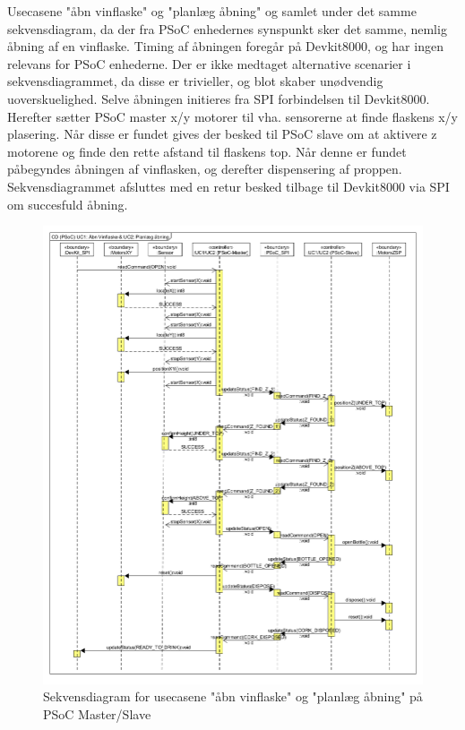 Usecasene "åbn vinflaske" og "planlæg åbning" og samlet under det samme sekvensdiagram, da der fra PSoC enhedernes synspunkt sker det samme, nemlig 
åbning af en vinflaske. Timing af åbningen foregår på Devkit8000, og har ingen relevans for PSoC enhederne. Der er ikke medtaget alternative scenarier i 
sekvensdiagrammet, da disse er trivieller, og blot skaber unødvendig uoverskuelighed. Selve åbningen initieres fra SPI forbindelsen til Devkit8000. Herefter
sætter PSoC master x/y motorer til vha. sensorerne at finde flaskens x/y plasering. Når disse er fundet gives der besked til PSoC slave om at aktivere z motorene
og finde den rette afstand til flaskens top. Når denne er fundet påbegyndes åbningen af vinflasken, og derefter dispensering af proppen. Sekvensdiagrammet
afsluttes med en retur besked tilbage til Devkit8000 via SPI om succesfuld åbning.

\begin{figure}[H]
\includegraphics[scale=0.8]{Software/Sekvendiagram_PSoC}
\caption{Sekvensdiagram for usecasene "åbn vinflaske" og "planlæg åbning" på PSoC Master/Slave}
\end{figure}
